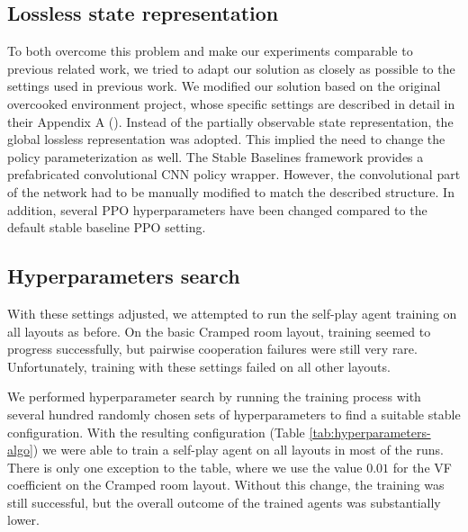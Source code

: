 \subsection*{Lossless state representation}
To both overcome this problem and make our experiments comparable to previous related work, we tried to adapt our solution as closely as possible to the settings used in previous work.
We modified our solution based on the original overcooked environment project, whose specific settings are described in detail in their Appendix A (\cite{carroll2020utility}).
Instead of the partially observable state representation, the global lossless representation was adopted.
This implied the need to change the policy parameterization as well.
The Stable Baselines framework provides a prefabricated convolutional CNN policy wrapper.
However, the convolutional part of the network had to be manually modified to match the described structure.
In addition, several PPO hyperparameters have been changed compared to the default stable baseline PPO setting.


\subsection*{Hyperparameters search}
With these settings adjusted, we attempted to run the self-play agent training on all layouts as before.
On the basic Cramped room layout, training seemed to progress successfully, but pairwise cooperation failures were still very rare.
Unfortunately, training with these settings failed on all other layouts.

We performed hyperparameter search by running the training process with several hundred randomly chosen sets of hyperparameters to find a suitable stable configuration.
With the resulting configuration (Table \ref{tab:hyperparameters-algo}) we were able to train a self-play agent on all layouts in most of the runs.
There is only one exception to the table, where we use the value $0.01$ for the VF coefficient on the Cramped room layout.
Without this change, the training was still successful, but the overall outcome of the trained agents was substantially lower.

